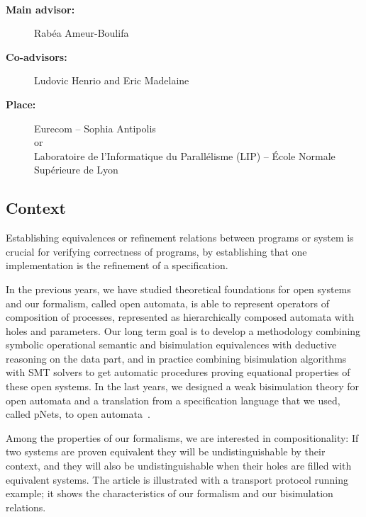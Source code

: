 \documentclass[11pt,fleqn]{article}
\begin{document}
\begin{center}
\\\bigskip
{}
\end{center}
\medskip

\begin{description}
\item[\bf Main advisor:] Rabéa Ameur-Boulifa 
\item[\bf Co-advisors:] Ludovic Henrio and Eric Madelaine
\item[\bf Place:] Eurecom  -- Sophia Antipolis
\\
or\\
Laboratoire de l'Informatique du Parallélisme (LIP) --
  \'Ecole Normale Supérieure de Lyon
\end{description}

\subsection*{Context}


Establishing equivalences or refinement relations between programs or system is crucial  for verifying correctness of programs, by establishing that one implementation is the refinement of a specification. 

In the previous years, we have studied theoretical foundations for open
systems and our formalism, called open automata, is able to represent operators of composition of processes,  represented
as hierarchically composed automata with holes and parameters. 
Our long 
term goal is to 
develop a methodology combining symbolic operational semantic and bisimulation 
equivalences with deductive reasoning on the data part, 
and in practice combining bisimulation algorithms with SMT solvers to get automatic 
procedures proving equational properties
of these open systems. In the last years, we designed a weak bisimulation theory for  open automata and a translation from a specification language that we used, called pNets, to open automata~\cite{arxiv-weakbisim,henrio:Forte2016,hou:hal-02406098}.


Among the properties of our formalisms, we are interested in compositionality: If two systems are proven equivalent they will be undistinguishable by their context, and they will also be undistinguishable when their holes are filled with equivalent systems.
The article \cite{arxiv-weakbisim} is illustrated with a transport protocol running example; it shows the characteristics of our formalism and our bisimulation relations.
\end{document}
